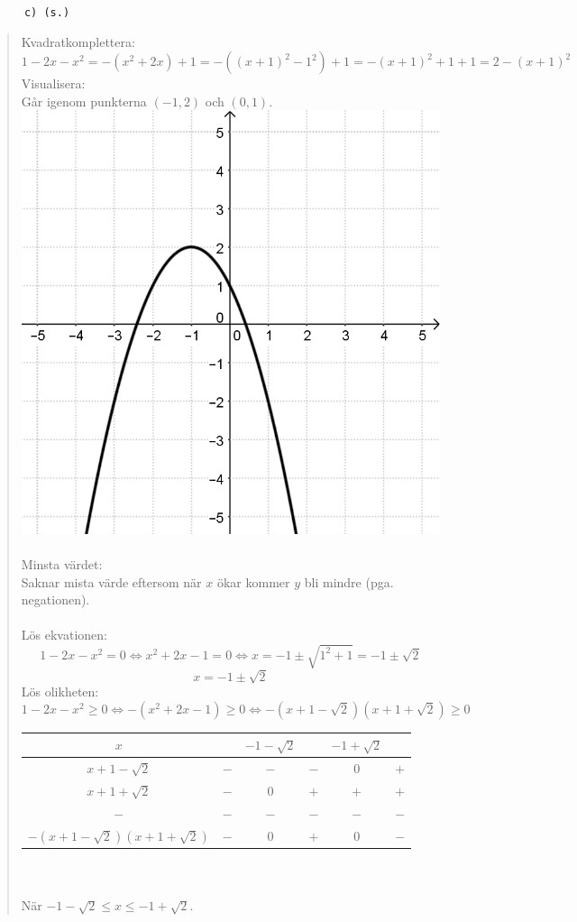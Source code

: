 \documentclass[a4paper]{article}
\newcommand{\tskcol}[1]{\textcolor{tskcol}{#1}}
\begin{document}
	\pagebreak
	\texttt{\tskcol{~~~~~~c) (s.)}}
	\begin{quotation}
		\noindent
		Kvadratkomplettera:
		\[1-2x-x^2=-(x^2+2x)+1=-((x+1)^2-1^2)+1=-(x+1)^2+1+1=2-(x+1)^2\]
		Visualisera: \\
		Går igenom punkterna $(-1,2)$ och $(0,1)$. \\
		\includegraphics[scale=0.2]{images/59c.png} \\ \\
		Minsta värdet: \\
		Saknar mista värde eftersom när $x$ ökar kommer $y$ bli mindre (pga. negationen). \\ \\
		Lös ekvationen:
		\[1-2x-x^2=0 \Leftrightarrow
		x^2+2x-1=0 \Leftrightarrow
		x=-1\pm\sqrt{1^2+1}=-1\pm\sqrt{2}\]
		\[x=-1\pm\sqrt{2}\]
		Lös olikheten:
		\[1-2x-x^2\ge0 \Leftrightarrow
		-(x^2+2x-1)\ge0 \Leftrightarrow
		-(x+1-\sqrt{2})(x+1+\sqrt{2})\ge0\]
		\begin{tabular}{c|c|c|c|c|c}
			$x$                             &     &$-1-\sqrt{2}$&     &$-1+\sqrt{2}$&     \\ \hline
			$x+1-\sqrt{2}$                  & $-$ &     $-$     & $-$ &     $0$     & $+$ \\
			$x+1+\sqrt{2}$                  & $-$ &     $0$     & $+$ &     $+$     & $+$ \\ 
			$-$                             & $-$ &     $-$     & $-$ &     $-$     & $-$ \\ \hline
			$-(x+1-\sqrt{2})(x+1+\sqrt{2})$	& $-$ &     $0$     & $+$ &     $0$     & $-$ \\
		\end{tabular} \\ \\
		När $-1-\sqrt{2} \le x \le -1+\sqrt{2}$.
	\end{quotation}
	
\end{document}

